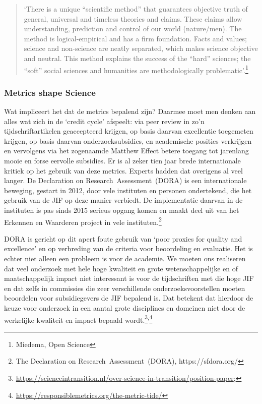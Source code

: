 \documentclass[empirical, authordate, ]{new-jote-article}
\begin{document}
	\begin{quote}
		\itshape

		‘There is a unique “scientific method” that guarantees objective truth of general, universal and timeless theories and claims. These claims allow understanding, prediction and control of our world (nature/men). The method is logical-empirical and has a firm foundation. Facts and values; science and non-science are neatly separated, which makes science objective and neutral. This method explains the success of the “hard” sciences; the “soft” social sciences and humanities are methodologically problematic'.\footnote{Miedema, Open Science}
	\end{quote}

	\subsubsection{Metrics shape Science}



	Wat impliceert het dat de metrics bepalend zijn? Daarmee moet men denken aan alles wat zich in de ‘credit cycle' afspeelt: via peer review in zo'n tijdschriftartikelen geaccepteerd krijgen, op basis daarvan excellentie toegemeten krijgen, op basis daarvan onderzoeksubsidies, en academische posities verkrijgen en vervolgens via het zogenaamde Matthew Effect betere toegang tot jarenlang mooie en forse eervolle subsidies. Er is al zeker tien jaar brede internationale kritiek op het gebruik van deze metrics. Experts hadden dat overigens al veel langer. De Declaration on Research Assessment (DORA) is een internationale beweging, gestart in 2012, door vele instituten en personen ondertekend, die het gebruik van de JIF op deze manier verbiedt. De implementatie daarvan in de instituten is pas sinds 2015 serieus opgang komen en maakt deel uit van het Erkennen en Waarderen project in vele instituten.\footnote{The Declaration on Research Assessment (DORA), https://sfdora.org/}



	DORA is gericht op dit apert foute gebruik van ‘poor proxies for quality and excellence' en op verbreding van de criteria voor beoordeling en evaluatie. Het is echter niet alleen een probleem is voor de academie. We moeten ons realiseren dat veel onderzoek met hele hoge kwaliteit en grote wetenschappelijke en of maatschappelijk impact niet interessant is voor de tijdschriften met die hoge JIF en dat zelfs in commissies die zeer verschillende onderzoeksvoorstellen moeten beoordelen voor subsidiegevers de JIF bepalend is. Dat betekent dat hierdoor de keuze voor onderzoek in een aantal grote disciplines en domeinen niet door de werkelijke kwaliteit en impact bepaald wordt.\footnote{\href{https://scienceintransition.nl/over-science-in-transition/position-paper}{https://scienceintransition.nl/over-science-in-transition/position-paper}; }\textsuperscript{,}\footnote{\href{https://responsiblemetrics.org/the-metric-tide/}{https://responsiblemetrics.org/the-metric-tide/}}
\end{document}
